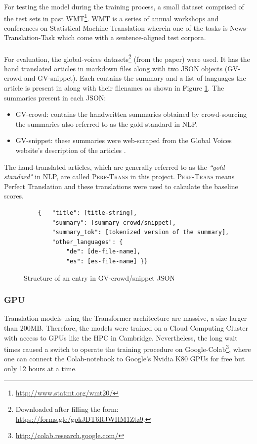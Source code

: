 \documentclass[12pt,a4paper,twoside,openright]{report}
\newcommand{\perftrans}{\textsc{Perf-Trans} }
\begin{document}
For testing the model during the training process, a small dataset comprised of the test sets in past WMT\footnote{\url{http://www.statmt.org/wmt20/}}. WMT is a series of annual workshops and conferences on Statistical Machine Translation wherein one of the tasks is News-Translation-Task which come with a sentence-aligned test corpora.
\\\\
For evaluation, the global-voices datasets\footnote{Downloaded after filling the form: \url{https://forms.gle/gpkJDT6RJWHM1Ztz9}.} (from the paper\cite{nguyen-daume-iii-2019-global}) were used. It has the hand translated articles in markdown files along with two JSON objects (GV-crowd and GV-snippet). Each contains the summary and a list of languages the article is present in along with their filenames as shown in Figure \ref{lst:example-json}. The summaries present in each JSON: \begin{itemize}
    \item GV-crowd: contains the handwritten summaries obtained by crowd-sourcing the summaries also referred to as the gold standard in NLP.
    \item GV-snippet: these summaries were web-scraped from the Global Voices website's description of the articles .
\end{itemize}
The hand-translated articles, which are generally referred to as the \textit{``gold standard"} in NLP, are called \perftrans in this project. \perftrans means Perfect Translation and these translations were used to calculate the baseline scores.


\begin{figure}[H]
\begin{lstlisting}
    {   "title": [title-string],
        "summary": [summary crowd/snippet],
        "summary_tok": [tokenized version of the summary],
        "other_languages": {
            "de": [de-file-name],
            "es": [es-file-name] }}
\end{lstlisting}
\caption{Structure of an entry in GV-crowd/snippet JSON}
\label{lst:example-json}
\end{figure}



\subsubsection{GPU}
Translation models using the Transformer architecture are massive, a size larger than 200MB. Therefore, the models were trained on a Cloud Computing Cluster with access to GPUs like the HPC in Cambridge. Nevertheless, the long wait times caused a switch to operate the training procedure on Google-Colab\footnote{\url{http://colab.research.google.com/}}, where one can connect the Colab-notebook to Google's Nvidia K80 GPUs for free but only 12 hours at a time.
\end{document}
